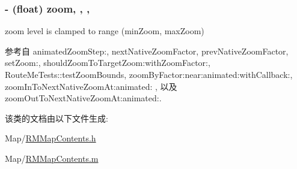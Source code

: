 \hypertarget{interface_r_m_map_contents_a199c766d9970b90672f8884856c7cd4e}{
\subsubsection[{zoom}]{\setlength{\rightskip}{0pt plus 5cm}-\/ (float) zoom\hspace{0.3cm}{\ttfamily [read]}, {\ttfamily [write]}, {\ttfamily [atomic]}, {\ttfamily [assign]}}}\label{interface_r_m_map_contents_a199c766d9970b90672f8884856c7cd4e}


zoom level is clamped to range (min\-Zoom, max\-Zoom) 



参考自 animated\-Zoom\-Step\-:, next\-Native\-Zoom\-Factor, prev\-Native\-Zoom\-Factor, set\-Zoom\-:, should\-Zoom\-To\-Target\-Zoom\-:with\-Zoom\-Factor\-:, Route\-Me\-Tests\-::test\-Zoom\-Bounds, zoom\-By\-Factor\-:near\-:animated\-:with\-Callback\-:, zoom\-In\-To\-Next\-Native\-Zoom\-At\-:animated\-: , 以及 zoom\-Out\-To\-Next\-Native\-Zoom\-At\-:animated\-:.



该类的文档由以下文件生成\-:\begin{DoxyCompactItemize}
\item 
Map/\hyperlink{_r_m_map_contents_8h}{R\-M\-Map\-Contents.\-h}\item 
Map/\hyperlink{_r_m_map_contents_8m}{R\-M\-Map\-Contents.\-m}\end{DoxyCompactItemize}

